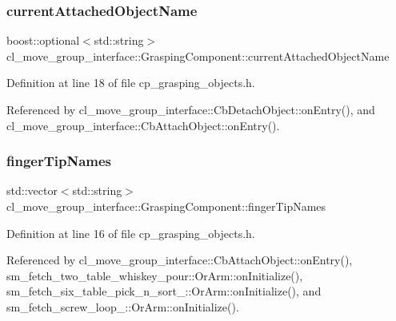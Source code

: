 \subsubsection{\texorpdfstring{current\+Attached\+Object\+Name}{currentAttachedObjectName}}
{\footnotesize\ttfamily boost\+::optional$<$std\+::string$>$ cl\+\_\+move\+\_\+group\+\_\+interface\+::\+Grasping\+Component\+::current\+Attached\+Object\+Name}



Definition at line 18 of file cp\+\_\+grasping\+\_\+objects.\+h.



Referenced by cl\+\_\+move\+\_\+group\+\_\+interface\+::\+Cb\+Detach\+Object\+::on\+Entry(), and cl\+\_\+move\+\_\+group\+\_\+interface\+::\+Cb\+Attach\+Object\+::on\+Entry().

\mbox{\label{classcl__move__group__interface_1_1GraspingComponent_afc08a0abc3220a377d0bbf798383a42a}} 
\subsubsection{\texorpdfstring{finger\+Tip\+Names}{fingerTipNames}}
{\footnotesize\ttfamily std\+::vector$<$std\+::string$>$ cl\+\_\+move\+\_\+group\+\_\+interface\+::\+Grasping\+Component\+::finger\+Tip\+Names}



Definition at line 16 of file cp\+\_\+grasping\+\_\+objects.\+h.



Referenced by cl\+\_\+move\+\_\+group\+\_\+interface\+::\+Cb\+Attach\+Object\+::on\+Entry(), sm\+\_\+fetch\+\_\+two\+\_\+table\+\_\+whiskey\+\_\+pour\+::\+Or\+Arm\+::on\+Initialize(), sm\+\_\+fetch\+\_\+six\+\_\+table\+\_\+pick\+\_\+n\+\_\+sort\+\_\+::\+Or\+Arm\+::on\+Initialize(), and sm\+\_\+fetch\+\_\+screw\+\_\+loop\+\_\+::\+Or\+Arm\+::on\+Initialize().

\mbox{\label{classcl__move__group__interface_1_1GraspingComponent_a5e0364a3b76738fb263b11c4e1ef56cc}} 
